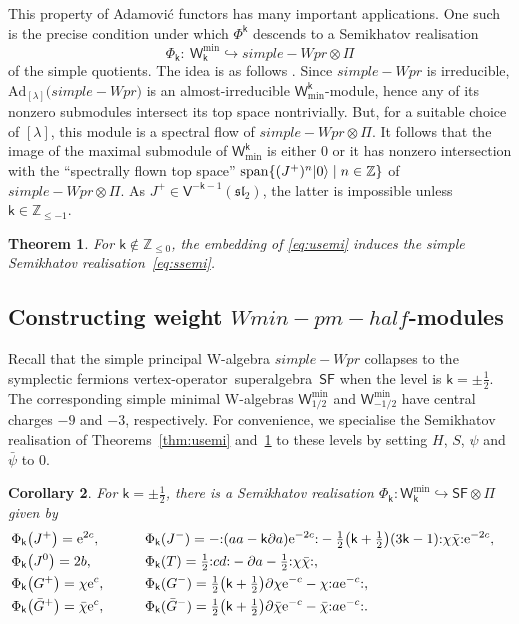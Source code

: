 \documentclass[10pt,a4paper]{amsart}
\numberwithin{equation}{section}
\newcommand{\pd}{\partial} %
\newcommand{\bchi}{\bar{\chi}{}} %
\newcommand{\bpsi}{\bar{\psi}{}} %
\newcommand{\bG}{\bar{G}{}}
\newcommand{\ee}{\mathrm{e}} %
\newcommand{\kk}{\mathsf{k}} %
\renewcommand{\le}{\leqslant} %
\DeclarePairedDelimiter{\brac}{\lparen}{\rparen} %
\newcommand{\no}[1]{\mathopen{:} #1 \mathclose{:}} %
\DeclarePairedDelimiter{\ket}{\lvert}{\rangle}
\DeclareMathOperator{\spn}{span}
\newcommand{\ira}{\hookrightarrow}
\newcommand{\fld}[1]{\mathbb{#1}} %
\newcommand{\alg}[1]{\mathfrak{#1}} %
\newcommand{\VOA}[1]{\mathsf{#1}} %
\newcommand{\categ}[1]{\mathrm{#1}} %
\newcommand{\ZZ}{\fld{Z}}
\newcommand{\SLA}[2]{\alg{#1}_{#2}} %
\newcommand{\sltwo}{\SLA{sl}{2}}
\newcommand{\sfsymb}{\VOA{SF}}
\newcommand{\lsymb}{\Pi}
\newcommand{\sfvoa}{\sfsymb} %
\newcommand{\lvoa}{\lsymb} %
\newcommand{\uaff}[2]{\VOA{V}^{#1}(#2)} %
\newcommand{\usl}[1][\kk]{\uaff{#1}{\sltwo}} %
\newcommand{\uwalg}[2]{\VOA{W}^{#1}_{\mathrm{#2}}} %
\newcommand{\swalg}[2]{\VOA{W}_{#1}^{\mathrm{#2}}} %
\newcommand{\umin}[1][\kk]{\uwalg{#1}{min}} %
\newcommand{\spr}[1][\kk]{\swalg{#1}{pr}} %
\newcommand{\smin}[1][\kk]{\swalg{#1}{min}} %
\newcommand{\sminpmhalf}{\smin[\pm 1/2]}
\newcommand{\adfunc}[1]{\categ{Ad}_{[#1]}}
\newcommand{\vo}{vertex-operator}
\newcommand{\svoa}{\vo\ superalgebra}
\newtheorem{Theorem}{Theorem}[section]
\newtheorem{Corollary}[Theorem]{Corollary}
\def\boldsymbol#1{#1}
\def\smash#1{#1}
\def\spr{simple-Wpr}
\def\sminpmhalf{Wmin-pm-half}
\begin{document}
This property of Adamovi\'{c} functors has many important applications.
One such is the precise condition under which $\Phi^{\kk}$ descends to a Semikhatov realisation
\begin{equation} \label{eq:ssemi}
	\Phi_{\kk} \colon\ \smin \ira \spr \otimes \lvoa
\end{equation}
of the simple quotients.
The idea is as follows \cite{AdaRea20}.
Since $\spr$ is irreducible, $\adfunc{\lambda}\big(\spr\big)$ is an almost-irreducible \smash{$\umin$}-module, hence any of its nonzero submodules intersect its top space nontrivially.
But, for a suitable choice of $[\lambda]$, this module is a spectral flow of $\spr \otimes \lvoa$.
It follows that the image of the maximal submodule of $\umin$ is either $0$ or it has nonzero intersection with the ``spectrally flown top space'' $\spn\{(J^+)^n \ket{0} \mid n \in \ZZ\}$ of $\spr \otimes \lvoa$.
As $J^+ \in \usl[-\kk-1]$, the latter is impossible unless $\kk \in \ZZ_{\le-1}$.
%
\begin{Theorem} \label{thm:ssemi}
	For $\kk \notin \ZZ_{\le0}$, the embedding of \eqref{eq:usemi} induces the simple Semikhatov realisation~\eqref{eq:ssemi}.
\end{Theorem}

\subsection[Constructing weight sminpmhalf-modules]{Constructing weight $\boldsymbol{\sminpmhalf}$-modules} \label{sec:k=+-1/2}

Recall that the simple principal W-algebra $\spr$ collapses to the symplectic fermions \svoa\ $\sfvoa$ when the level is $\kk=\pm\frac{1}{2}$.
The corresponding simple minimal W-algebras $\smin[1/2]$ and $\smin[-1/2]$ have central charges $-9$ and $-3$, respectively.
For convenience, we specialise the Semikhatov realisation of Theorems~\ref{thm:usemi} and~\ref{thm:ssemi} to these levels by setting $H$, $S$, $\psi$ and $\bpsi$ to $0$.
%
\begin{Corollary} \label{cor:pmhalf}
	For $\kk = \pm\frac{1}{2}$, there is a Semikhatov realisation $\Phi_{\kk} \colon \smin \ira \sfvoa \otimes \lvoa$ given by
	\begin{alignat}{3}
 & \Phi_{\kk}\big(J^+\big) = \ee^{2c}, \qquad&&
 \Phi_{\kk}(J^-) = -\no{\brac*{aa - \kk \pd a} \ee^{-2c}} - \tfrac{1}{2}\bigl(\kk+\tfrac{1}{2}\bigr)(3\kk-1) \no{\chi \bchi} \ee^{-2c},&\nonumber \\
& \Phi_{\kk}\big(J^0\big) = 2b, \qquad&&
 \Phi_{\kk}(T) = \tfrac{1}{2} \no{cd} - \pd a - \tfrac{1}{2} \no{\chi\bchi},& \nonumber\\
& \Phi_{\kk}\big(G^+\big) = \chi \ee^c, \qquad&&
 \Phi_{\kk}(G^-) = \tfrac{1}{2}\bigl(\kk+\tfrac{1}{2}\bigr)\pd \chi \ee^{-c} - \chi \no{a \ee^{-c}},& \nonumber\\
& \Phi_{\kk}\big(\bG^+\big) = \bchi \ee^c, \qquad&&
 \Phi_{\kk}(\bG^-) = \tfrac{1}{2}\bigl(\kk+\tfrac{1}{2}\bigr)\pd \bchi \ee^{-c} - \bchi \no{a \ee^{-c}}.&\label{eq:simplequotemb}
	\end{alignat}
\end{Corollary}
\end{document}

